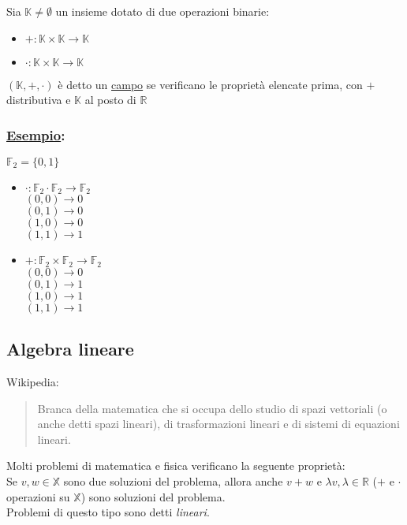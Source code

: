 \documentclass{article}
\newcommand{\ul}[1]{\underline{#1}}
\newcommand{\K}{\mathbb{K}}
\newcommand{\R}{\mathbb{R}}
\newcommand{\Esempio}[1]{\subsubsection*{\ul{Esempio}:}#1}
\begin{document}
Sia $\K\not=\emptyset$ un insieme dotato di due operazioni binarie:
\begin{itemize}
	\item $+:\K\times\K\rightarrow\K$
	\item $\cdot:\K\times\K\rightarrow\K$
\end{itemize}
$(\K,+,\cdot)$ è detto un \ul{campo} se verificano le proprietà elencate prima, con $+$ distributiva e $\K$ al posto di $\R$

\Esempio{$\mathbb{F}_2=\{0, 1\}$
	\begin{itemize}
		\item $\cdot:\mathbb{F}_2\cdot\mathbb{F}_2\rightarrow\mathbb{F}_2$\\
		  \hspace*{1.8em}$(0,0)\rightarrow 0$\\
		  \hspace*{1.8em}$(0,1)\rightarrow 0$\\
		  \hspace*{1.8em}$(1,0)\rightarrow 0$\\
		  \hspace*{1.8em}$(1,1)\rightarrow 1$
		\item $+:\mathbb{F}_2\times\mathbb{F}_2\rightarrow\mathbb{F}_2$\\
		  \hspace*{1.8em}$(0,0)\rightarrow 0$\\
		  \hspace*{1.8em}$(0,1)\rightarrow 1$\\
		  \hspace*{1.8em}$(1,0)\rightarrow 1$\\
		  \hspace*{1.8em}$(1,1)\rightarrow 1$
\end{itemize}}
\subsection{Algebra lineare}
Wikipedia:
\begin{quotation}
	Branca della matematica che si occupa dello studio di spazi vettoriali (o anche detti spazi lineari), di trasformazioni lineari e di sistemi di equazioni lineari.
\end{quotation}
Molti problemi di matematica e fisica verificano la seguente proprietà:\\
Se $v,w\in\mathbb{X}$ sono due soluzioni del problema, allora anche $v+w$ e $\lambda v,\lambda\in\R$  ($+$ e $\cdot$ operazioni su $\mathbb{X}$) sono soluzioni del problema.\\
Problemi di questo tipo sono detti \textit{lineari}.
\end{document}
